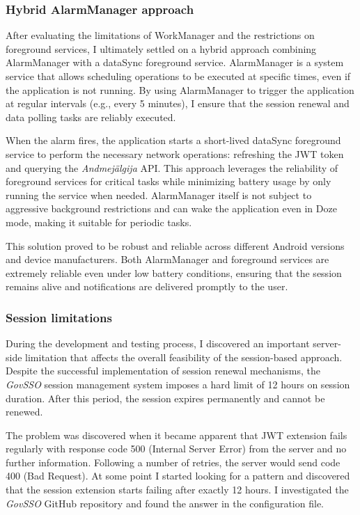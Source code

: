 \subsubsection{Hybrid AlarmManager approach}
\label{alarmmanager-approach}
After evaluating the limitations of WorkManager and the restrictions on foreground services, I ultimately settled on a hybrid approach combining AlarmManager with a dataSync foreground service. AlarmManager is a system service that allows scheduling operations to be executed at specific times, even if the application is not running. By using AlarmManager to trigger the application at regular intervals (e.g., every 5 minutes), I ensure that the session renewal and data polling tasks are reliably executed.

When the alarm fires, the application starts a short-lived dataSync foreground service to perform the necessary network operations: refreshing the JWT token and querying the \textit{Andmejälgija} API. This approach leverages the reliability of foreground services for critical tasks while minimizing battery usage by only running the service when needed. AlarmManager itself is not subject to aggressive background restrictions and can wake the application even in Doze mode, making it suitable for periodic tasks.

This solution proved to be robust and reliable across different Android versions and device manufacturers. Both AlarmManager and foreground services are extremely reliable even under low battery conditions, ensuring that the session remains alive and notifications are delivered promptly to the user.

\subsubsection{Session limitations}
\label{session-limitations}
During the development and testing process, I discovered an important server-side limitation that affects the overall feasibility of the session-based approach. Despite the successful implementation of session renewal mechanisms, the \textit{GovSSO} session management system imposes a hard limit of 12 hours on session duration. After this period, the session expires permanently and cannot be renewed.

The problem was discovered when it became apparent that JWT extension fails regularly with response code 500 (Internal Server Error) from the server and no further information. Following a number of retries, the server would send code 400 (Bad Request). At some point I started looking for a pattern and discovered that the session extension starts failing after exactly 12 hours. I investigated the \textit{GovSSO} GitHub repository \cite{govsso-session} and found the answer in the configuration file.

